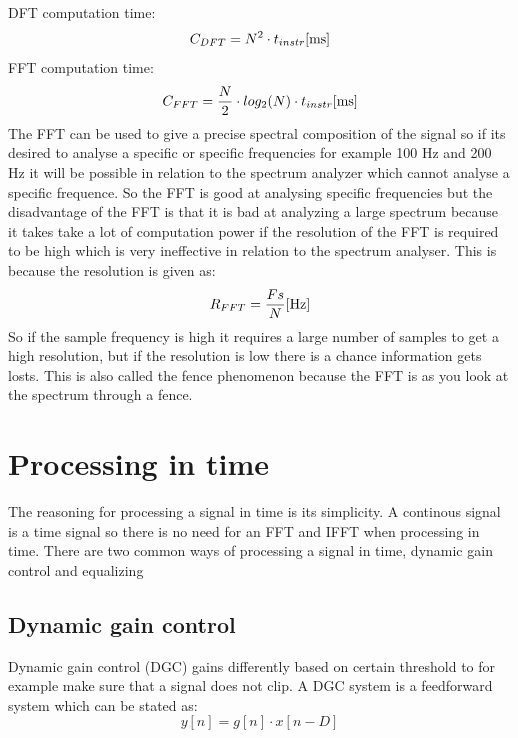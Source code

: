 
DFT computation time:
\begin{equation}
C_{DFT} = N^{2}\cdot t_{instr} \enhed{ms}
\end{equation}
FFT computation time:
\begin{equation}
C_{FFT} = \frac{N}{2}\cdot log_{2}(N)\cdot t_{instr} \enhed{ms}
\end{equation}
The FFT can be used to give a precise spectral composition of the signal so if its desired to analyse a specific or specific frequencies for example 100 Hz and 200 Hz it will be possible in relation to the spectrum analyzer which cannot analyse a specific frequence. So the FFT is good at analysing specific frequencies but the disadvantage of the FFT is that it is bad at analyzing a large spectrum because it takes take a lot of computation power if the resolution of the FFT is required to be high which is very ineffective in relation to the spectrum analyser. This is because the resolution is given as:
\begin{equation}
R_{FFT} = \frac{Fs}{N} \enhed{Hz}
\end{equation} 
So if the sample frequency is high it requires a large number of samples to get a high resolution, but if the resolution is low there is a chance information gets losts. This is also called the fence phenomenon because the FFT is as you look at the spectrum through a fence. 









\section{Processing in time}
The reasoning for processing a signal in time is its simplicity. A continous signal is a time signal so there is no need for an FFT and IFFT when processing in time. There are two common ways of processing a signal in time, dynamic gain control and equalizing  


\subsection*{Dynamic gain control}
Dynamic gain control (DGC) gains differently based on certain threshold to for example make sure that a signal does not clip. A DGC system is a feedforward system which can be stated as:
\begin{equation}
y[n] = g[n]\cdot x[n-D]
\end{equation}

